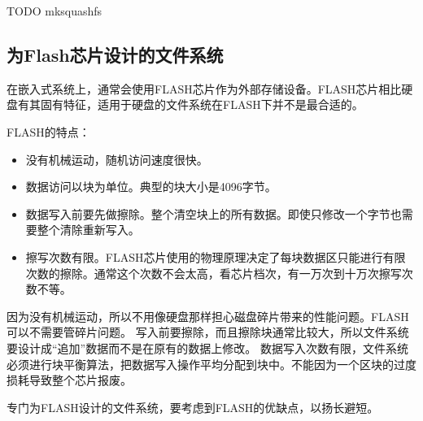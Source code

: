 TODO mksquashfs 


\subsection{为Flash芯片设计的文件系统}

在嵌入式系统上，通常会使用FLASH芯片作为外部存储设备。FLASH芯片相比硬盘有其固有特征，适用于硬盘的文件系统在FLASH下并不是最合适的。

FLASH的特点：

\begin{itemize}
\item 没有机械运动，随机访问速度很快。
\item 数据访问以块为单位。典型的块大小是4096字节。
\item 数据写入前要先做擦除。整个清空块上的所有数据。即使只修改一个字节也需要整个清除重新写入。
\item 擦写次数有限。FLASH芯片使用的物理原理决定了每块数据区只能进行有限次数的擦除。通常这个次数不会太高，看芯片档次，有一万次到十万次擦写次数不等。
\end{itemize}

因为没有机械运动，所以不用像硬盘那样担心磁盘碎片带来的性能问题。FLASH可以不需要管碎片问题。
写入前要擦除，而且擦除块通常比较大，所以文件系统要设计成“追加”数据而不是在原有的数据上修改。
数据写入次数有限，文件系统必须进行块平衡算法，把数据写入操作平均分配到块中。不能因为一个区块的过度损耗导致整个芯片报废。

专门为FLASH设计的文件系统，要考虑到FLASH的优缺点，以扬长避短。
